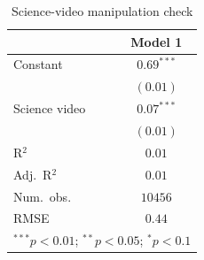 
\begin{table}
\begin{center}
\begin{tabular}{l c}
\hline
 & Model 1 \\
\hline
Constant      & $0.69^{***}$ \\
              & $(0.01)$     \\
Science video & $0.07^{***}$ \\
              & $(0.01)$     \\
\hline
R$^2$         & $0.01$       \\
Adj.\ R$^2$   & $0.01$       \\
Num.\ obs.    & $10456$      \\
RMSE          & $0.44$       \\
\hline
\multicolumn{2}{l}{\scriptsize{$^{***}p<0.01$; $^{**}p<0.05$; $^{*}p<0.1$}}
\end{tabular}
\caption{Science-video manipulation check}
\label{tab:man_science}
\end{center}
\end{table}

